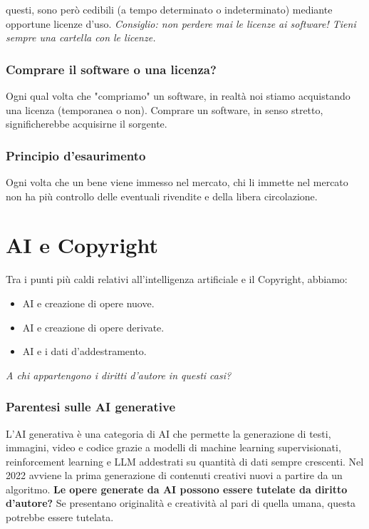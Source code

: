 questi, sono però cedibili (a tempo determinato o indeterminato) mediante opportune licenze d'uso. \textit{Consiglio: non perdere mai le licenze ai software! Tieni sempre una cartella con le licenze.}

\subsubsection{Comprare il software o una licenza?}
Ogni qual volta che "compriamo" un software, in realtà noi stiamo acquistando una licenza (temporanea o non). Comprare un software, in senso stretto, significherebbe acquisirne il sorgente.

\subsubsection{Principio d'esaurimento}
Ogni volta che un bene viene immesso nel mercato, chi li immette nel mercato non ha più controllo delle eventuali rivendite e della libera circolazione.

\section{AI e Copyright}
Tra i punti più caldi relativi all'intelligenza artificiale e il Copyright, abbiamo:

\begin{itemize}
	\item AI e creazione di opere nuove.
	\item AI e creazione di opere derivate.
	\item AI e i dati d'addestramento.
\end{itemize}

\begin{center}
	\textit{A chi appartengono i diritti d'autore in questi casi?}
\end{center}


\subsubsection{Parentesi sulle AI generative}
L'AI generativa è una categoria di AI che permette la generazione di testi, immagini, video e codice grazie a modelli di machine learning supervisionati, reinforcement learning e LLM addestrati su quantità di dati sempre crescenti. Nel 2022 avviene la prima generazione di contenuti creativi nuovi a partire da un algoritmo. 
\textbf{Le opere generate da AI possono essere tutelate da diritto d'autore?}
Se presentano originalità e creatività al pari di quella umana, questa potrebbe essere tutelata.

